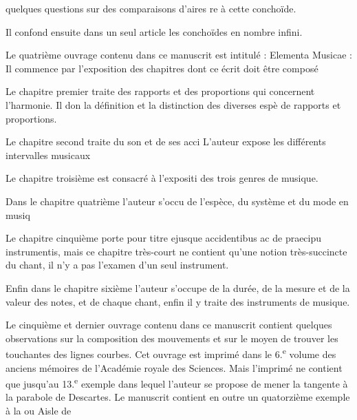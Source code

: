 \documentclass[11pt,a4paper]{article}
\begin{document}

quelques questions sur des comparaisons d'aires re\ill{} à cette conchoïde.

Il confond ensuite dans un seul article les \ill{} conchoïdes en nombre infini.

Le quatrième ouvrage contenu dans ce \ill{} manuscrit est intitulé : Elementa Musicae : Il commence par l'exposition des chapitres dont ce\ill{} écrit doit être composé

Le chapitre premier traite des rapports et des proportions qui concernent l'harmonie. Il don la définition et la distinction des diverses espè de rapports et proportions.

Le chapitre second traite du son et de ses acci\ill{} L'auteur expose les différents intervalles musicaux\ill{}

Le chapitre troisième est consacré à l'expositi des trois genres de musique.

Dans le chapitre quatrième l'auteur s'occu de l'espèce, du système et du mode en musiq

Le chapitre cinquième porte pour titre \ill{}  ejusque accidentibus ac de praecipu\ill{} instrumentis, mais ce chapitre très-court ne contient qu'une notion très-succincte du chant, il n'y a pas l'examen d'un seul instrument.

Enfin dans le chapitre sixième l'auteur s'occupe de la durée, de la mesure et de la valeur des notes, et de chaque chant, enfin il y traite des instruments de musique.

Le cinquième et dernier ouvrage contenu dans ce manuscrit contient quelques observations sur la composition des mouvements et sur le moyen de trouver les touchantes des lignes courbes. Cet ouvrage est imprimé dans le 6.\textsuperscript{e} volume des anciens mémoires de l'Académie royale des Sciences.
Mais l'imprimé ne contient que jusqu'au 13.\textsuperscript{e} exemple dans lequel l'auteur se propose de mener la tangente à la parabole de Descartes. Le manuscrit
contient en outre un quatorzième exemple à la  ou Aisle de 
\end{document}
